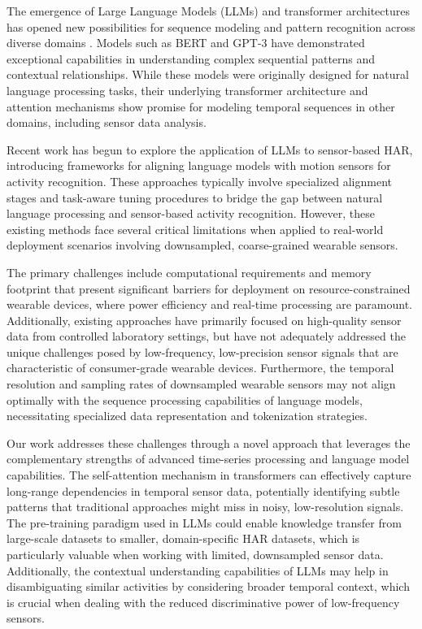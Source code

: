 The emergence of Large Language Models (LLMs) and transformer architectures has opened new possibilities for sequence modeling and pattern recognition across diverse domains \cite{Vaswani2017Attention}. Models such as BERT \cite{Devlin2019BERT} and GPT-3 \cite{Brown2020GPT3} have demonstrated exceptional capabilities in understanding complex sequential patterns and contextual relationships. While these models were originally designed for natural language processing tasks, their underlying transformer architecture and attention mechanisms show promise for modeling temporal sequences in other domains, including sensor data analysis.

Recent work has begun to explore the application of LLMs to sensor-based HAR, introducing frameworks for aligning language models with motion sensors for activity recognition. These approaches typically involve specialized alignment stages and task-aware tuning procedures to bridge the gap between natural language processing and sensor-based activity recognition. However, these existing methods face several critical limitations when applied to real-world deployment scenarios involving downsampled, coarse-grained wearable sensors.

The primary challenges include computational requirements and memory footprint that present significant barriers for deployment on resource-constrained wearable devices, where power efficiency and real-time processing are paramount. Additionally, existing approaches have primarily focused on high-quality sensor data from controlled laboratory settings, but have not adequately addressed the unique challenges posed by low-frequency, low-precision sensor signals that are characteristic of consumer-grade wearable devices. Furthermore, the temporal resolution and sampling rates of downsampled wearable sensors may not align optimally with the sequence processing capabilities of language models, necessitating specialized data representation and tokenization strategies.

Our work addresses these challenges through a novel approach that leverages the complementary strengths of advanced time-series processing and language model capabilities. The self-attention mechanism in transformers can effectively capture long-range dependencies in temporal sensor data, potentially identifying subtle patterns that traditional approaches might miss in noisy, low-resolution signals. The pre-training paradigm used in LLMs could enable knowledge transfer from large-scale datasets to smaller, domain-specific HAR datasets, which is particularly valuable when working with limited, downsampled sensor data. Additionally, the contextual understanding capabilities of LLMs may help in disambiguating similar activities by considering broader temporal context, which is crucial when dealing with the reduced discriminative power of low-frequency sensors.

